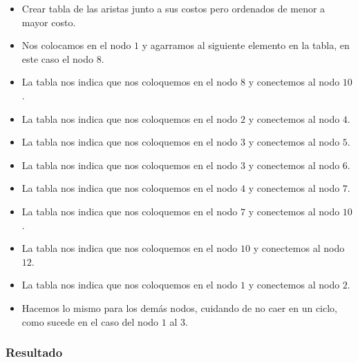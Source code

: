 \documentclass[12pt]{article}
\begin{document}
            \begin{itemize}
    
             \item[\checkmark] Crear tabla de las aristas junto a sus costos pero ordenados de menor a mayor costo.

              \item[\checkmark] Nos colocamos en el nodo $1$ y agarramos al siguiente elemento en la tabla, en este caso el nodo $8$.
              
              \item[\checkmark] La tabla nos indica que nos coloquemos en el nodo $8$ y conectemos al nodo $10$.
              
              \item[\checkmark] La tabla nos indica que nos coloquemos en el nodo $2$ y conectemos al nodo $4$.
              
              \item[\checkmark] La tabla nos indica que nos coloquemos en el nodo $3$ y conectemos al nodo $5$.
              
              \item[\checkmark] La tabla nos indica que nos coloquemos en el nodo $3$ y conectemos al nodo $6$.
              
              \item[\checkmark] La tabla nos indica que nos coloquemos en el nodo $4$ y conectemos al nodo $7$.
              
              \item[\checkmark] La tabla nos indica que nos coloquemos en el nodo $7$ y conectemos al nodo $10$.
              
              \item[\checkmark] La tabla nos indica que nos coloquemos en el nodo $10$ y conectemos al nodo $12$.
              
              \item[\checkmark] La tabla nos indica que nos coloquemos en el nodo $1$ y conectemos al nodo $2$.
              
              \item[\checkmark] Hacemos lo mismo para los demás nodos, cuidando de no caer en un ciclo, como sucede en el caso del nodo $1$ al $3$.
    
            \end{itemize}
\newpage
      \subsubsection{Resultado}
\end{document}
